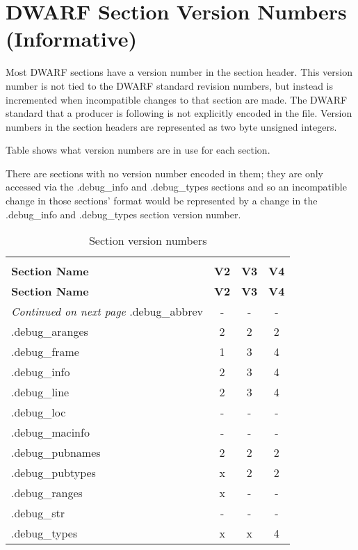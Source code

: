 
\chapter[Section Version Numbers (Informative)]{DWARF Section Version Numbers (Informative)}
\label{app:dwarfsectionversionnumbersinformative}


Most DWARF sections have a version number in the section
header. This version number is not tied to the DWARF standard
revision numbers, but instead is incremented when incompatible
changes to that section are made. The DWARF standard that
a producer is following is not explicitly encoded in the
file. Version numbers in the section headers are represented
as two byte unsigned integers. 

Table 
shows what version
numbers are in use for each section.

There are sections with no version number encoded in them;
they are only accessed via the .debug\_info and .debug\_types
sections and so an incompatible change in those sections'
format would be represented by a change in the .debug\_info
and .debug\_types section version number.

\clearpage
\begin{centering}
\setlength{\extrarowheight}{0.1cm}
\begin{longtable}{lccc}
  \caption{Section version numbers} \label{tab:sectionversionnumbers} \\
  \hline \\ \bfseries Section Name &\bfseries V2 &\bfseries V3 &\bfseries V4 \\ \hline
\endfirsthead
   \bfseries Section Name &\bfseries V2 &\bfseries V3 &\bfseries V4 \\ \hline
\endhead
  \hline \emph{Continued on next page}
\endfoot
  \hline
\endlastfoot
.debug\_abbrev& -  & -  & -  \\
.debug\_aranges&2&2&2 \\
.debug\_frame&1&3&4 \\
.debug\_info&2&3&4 \\
.debug\_line&2&3&4   \\
.debug\_loc& -  & -  & -  \\
.debug\_macinfo& -  & - & -   \\
.debug\_pubnames&2&2&2    \\
.debug\_pubtypes&x&2&2   \\
.debug\_ranges&x& - & -  \\
.debug\_str& -  & -  & -  \\
.debug\_types&x&x&4   \\
\end{longtable}
\end{centering}

